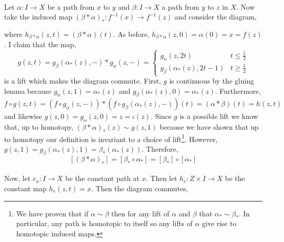 \documentclass[12pt]{extarticle}
\begin{document}
\bigskip\\
Let $\alpha : I \to X$ be a path from $x$ to $y$ and $\beta : I \to X$ a path from $y$ to $z$ in $X$. Now take the induced map $(\beta * \alpha)_* : f^{-1}(x) \to f^{-1}(z)$ and consider the diagram, 
\begin{center}
\end{center}
where $h_{\beta * \alpha} (z, t) = (\beta * \alpha)(t)$. As before, $h_{\beta * \alpha}(z, 0) = \alpha(0) = x = f(z)$. I claim that the map,
\[ 
g(z, t) = g_{\beta}(\alpha_*(z), -) * g_{\alpha}(z,-) 
= 
\begin{cases}
g_{\alpha}(z, 2t) & t \le \tfrac{1}{2}
\\
g_{\beta}(\alpha_*(z), 2t - 1) & t \ge \tfrac{1}{2}
\end{cases} \]
is a lift which makes the diagram commute. First, $g$ is continuous by the gluing lemma because $g_{\alpha}(z, 1) = \alpha_*(z)$ and $g_{\beta}(\alpha_*(z), 0) = \alpha_*(z)$. Furthermore, 
\[f \circ g(z, t) = (f \circ g_{\alpha}(z,-)) * (f \circ g_{\beta}(\alpha_*(z), -))(t) = (\alpha * \beta)(t) = h(z, t)\]
and likewise $g(z, 0) = g_{\alpha}(z, 0) = z = \iota(z)$. Since $g$ is a possible lift we know that, up to homotopy, $(\beta * \alpha)_*(z) \sim g(z, 1)$ because we have shown that up to homotopy our definition is invariant to a choice of lift\footnote{We have proven that if $\alpha \sim \beta$ then for any lift of $\alpha$ and $\beta$ that $\alpha_* \sim \beta_*$. In particular, any path is homotopic to itself so any lifts of $\alpha$ give rise to homotopic induced maps.}. However, $g(z, 1) = g_{\beta}(\alpha_*(z), 1) = \beta_*(\alpha_*(z))$. Therefore, 
\[[(\beta * \alpha)_*] = [ \beta_* \circ \alpha_*] = [\beta_*] \circ [\alpha_*]\]
\bigskip\\
Now, let $e_{x} : I \to X$ be the constant path at $x$. Then let $h_{e} : Z \times I \to X$ be the constant map $h_e(z, t) = x$. Then the diagram commutes, 
\begin{center}
\end{center}
\end{document}
